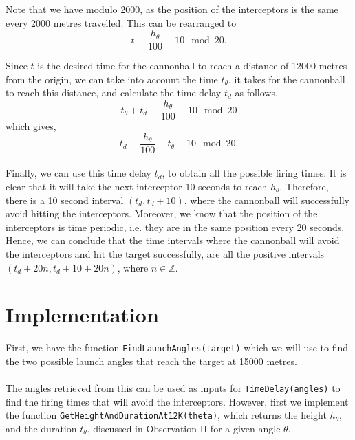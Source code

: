 \documentclass[11pt]{report}
\begin{document}
Note that we have modulo 2000, as the position of the interceptors is the same every 2000 metres travelled. This can be rearranged to $$t \equiv \frac{h_{\theta}}{100} - 10 \mod 20.$$

Since $t$ is the desired time for the cannonball to reach a distance of 12000 metres from the origin, we can take into account the time $t_{\theta}$, it takes for the cannonball to reach this distance, and calculate the time delay $t_d$ as follows, $$ t_{\theta} + t_d \equiv \frac{h_{\theta}}{100} - 10 \mod 20$$ which gives, 
\begin{equation}
	t_d \equiv \frac{h_{\theta}}{100} - t_{\theta} - 10 \mod 20.
	\label{eq:timedelay}
\end{equation} \\

Finally, we can use this time delay $t_d$, to obtain all the possible firing times. It is clear that it will take the next interceptor 10 seconds to reach $h_{\theta}$. Therefore, there is a 10 second interval $(t_d, t_d + 10)$, where the cannonball will successfully avoid hitting the interceptors. Moreover, we know that the position of the interceptors is time periodic, i.e. they are in the same position every 20 seconds. Hence, we can conclude that the time intervals where the cannonball will avoid the interceptors and hit the target successfully, are all the positive intervals $(t_d+20n, t_d+10+20n)$, where $n\in \mathbb{Z}$. 

\section{Implementation}
First, we have the function \texttt{FindLaunchAngles(target)} which we will use to find the two possible launch angles that reach the target at 15000 metres. \\


\ \\
The angles retrieved from this can be used as inputs for \texttt{TimeDelay(angles)} to find the firing times that will avoid the interceptors. However, first we implement the function \texttt{GetHeightAndDurationAt12K(theta)}, which returns the height $h_{\theta}$, and the duration $t_{\theta}$, discussed in Observation II for a given angle $\theta$. \\
\end{document}
